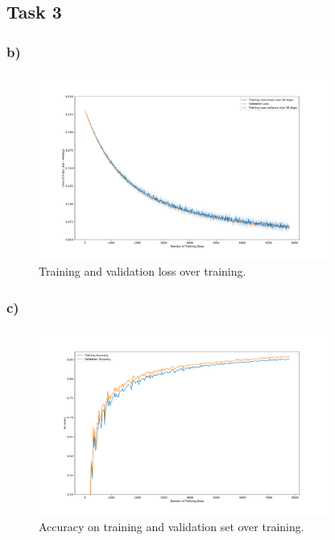 \newpage
\subsection*{Task 3}

\subsubsection*{b)}

\begin{figure}[h!]
    \centering
    \includegraphics[clip, trim=0cm 0cm 0cm 0cm,width=0.85\textwidth]{figures/Task3b.pdf}
    \caption{Training and validation loss over training.}
    \label{fig:task3:train_val_loss}
\end{figure}

\subsubsection*{c)}

\begin{figure}[h!]
    \centering
    \includegraphics[clip, trim=0cm 0cm 0cm 0cm,width=0.85\textwidth]{figures/Task3c.pdf}
    \caption{Accuracy on training and validation set over training.}
    \label{fig:task3:accuracy}
\end{figure}

